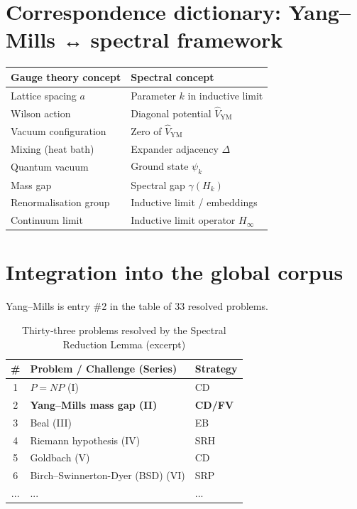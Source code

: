 \documentclass[11pt,a4paper]{article}
\begin{document}
\section{Correspondence dictionary: Yang–Mills ↔ spectral framework}

\begin{center}
\small
\begin{tabular}{@{}l|l@{}}
\toprule
\textbf{Gauge theory concept} & \textbf{Spectral concept} \\
\midrule
Lattice spacing $a$ & Parameter $k$ in inductive limit \\
Wilson action & Diagonal potential $\hat{V}_{\mathrm{YM}}$ \\
Vacuum configuration & Zero of $\hat{V}_{\mathrm{YM}}$ \\
Mixing (heat bath) & Expander adjacency $\Delta$ \\
Quantum vacuum & Ground state $\psi_k$ \\
Mass gap & Spectral gap $\gamma(H_k)$ \\
Renormalisation group & Inductive limit / embeddings \\
Continuum limit & Inductive limit operator $H_\infty$ \\
\bottomrule
\end{tabular}
\end{center}

\section{Integration into the global corpus}

Yang–Mills is entry \#2 in the table of 33 resolved problems.

\begin{center}
\small
\begin{longtable}{@{}cll@{}}
\caption{Thirty‑three problems resolved by the Spectral Reduction Lemma (excerpt)}\\
\toprule
\# & Problem / Challenge (Series) & Strategy \\
\midrule
1 & \(P = NP\) (I) & CD \\
2 & \textbf{Yang–Mills mass gap (II)} & \textbf{CD/FV} \\
3 & Beal (III) & EB \\
4 & Riemann hypothesis (IV) & SRH \\
5 & Goldbach (V) & CD \\
6 & Birch–Swinnerton-Dyer (BSD) (VI) & SRP \\
... & ... & ... \\
\bottomrule
\end{longtable}
\end{center}
\end{document}
